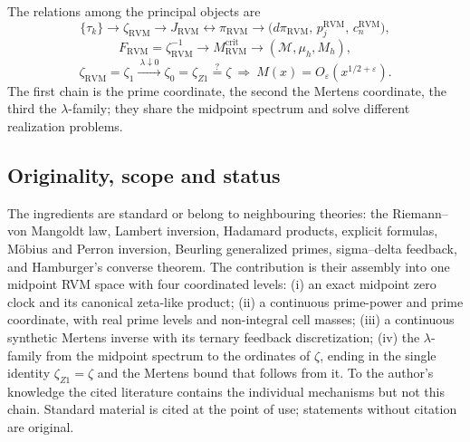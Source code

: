 \documentclass[11pt,reqno]{amsart}
\numberwithin{equation}{section}
\theoremstyle{plain}
\theoremstyle{definition}
\theoremstyle{remark}
\newcommand{\eps}{\varepsilon}
\newcommand{\RVM}{\mathrm{RVM}}
\newcommand{\crit}{\mathrm{crit}}
\begin{document}
The relations among the principal objects are
\begin{equation}\label{eq:intro-prime-chain}
 \{\tau_k\}\longrightarrow\zeta_{\RVM}\longrightarrow J_{\RVM}\longleftrightarrow\pi_{\RVM}\longrightarrow\bigl(d\pi_{\RVM},\,p_j^{\RVM},\,c_n^{\RVM}\bigr),
\end{equation}
\begin{equation}\label{eq:intro-M-chain}
 F_{\RVM}=\zeta_{\RVM}^{-1}\longrightarrow M_{\RVM}^{\crit}\longrightarrow(\mathcal M,\mu_h,M_h),
\end{equation}
\begin{equation}\label{eq:intro-family-chain}
 \zeta_{\RVM}=\zeta_1\xrightarrow{\ \lambda\downarrow0\ }\zeta_0=\zeta_{Z1}\overset{?}{=}\zeta\ \Longrightarrow\ M(x)=O_\eps(x^{1/2+\eps}).
\end{equation}
The first chain is the prime coordinate, the second the Mertens coordinate, the third the $\lambda$-family; they share the midpoint spectrum and solve different realization problems.

\subsection{Originality, scope and status}
\label{subsec:status}

The ingredients are standard or belong to neighbouring theories: the Riemann--von Mangoldt law, Lambert inversion, Hadamard products, explicit formulas, M\"obius and Perron inversion, Beurling generalized primes, sigma--delta feedback, and Hamburger's converse theorem.  The contribution is their assembly into one midpoint RVM space with four coordinated levels: (i) an exact midpoint zero clock and its canonical zeta-like product; (ii) a continuous prime-power and prime coordinate, with real prime levels and non-integral cell masses; (iii) a continuous synthetic Mertens inverse with its ternary feedback discretization; (iv) the $\lambda$-family from the midpoint spectrum to the ordinates of $\zeta$, ending in the single identity $\zeta_{Z1}=\zeta$ and the Mertens bound that follows from it.  To the author's knowledge the cited literature contains the individual mechanisms but not this chain.  Standard material is cited at the point of use; statements without citation are original.
\end{document}
